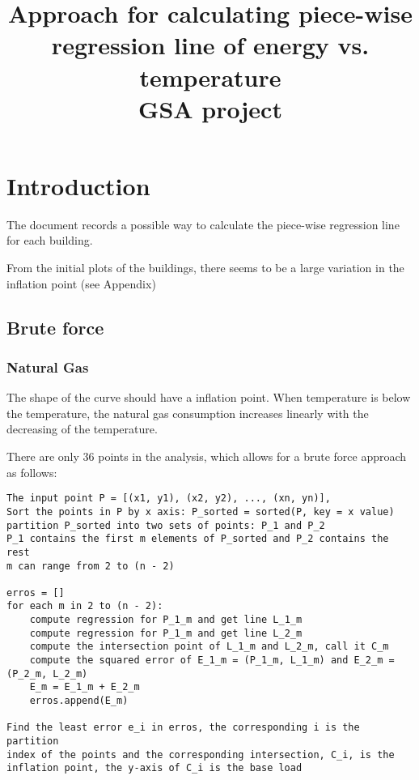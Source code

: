 \documentclass[12pt]{article}
\begin{document}
\title{Approach for calculating piece-wise regression line of energy vs. temperature\\
  \large GSA project}
\maketitle
\tableofcontents
\section{Introduction}
The document records a possible way to calculate the piece-wise
regression line for each building.

From the initial plots of the buildings, there seems to be a large
variation in the inflation point (see Appendix)

\subsection{Brute force}
\subsubsection{Natural Gas}
The shape of the curve should have a inflation point. When temperature
is below the temperature, the natural gas consumption increases
linearly with the decreasing of the temperature.

There are only 36 points in the analysis, which allows for a brute
force approach as follows:

\begin{verbatim}
The input point P = [(x1, y1), (x2, y2), ..., (xn, yn)], 
Sort the points in P by x axis: P_sorted = sorted(P, key = x value)
partition P_sorted into two sets of points: P_1 and P_2
P_1 contains the first m elements of P_sorted and P_2 contains the
rest
m can range from 2 to (n - 2)

erros = []
for each m in 2 to (n - 2):
    compute regression for P_1_m and get line L_1_m
    compute regression for P_1_m and get line L_2_m
    compute the intersection point of L_1_m and L_2_m, call it C_m
    compute the squared error of E_1_m = (P_1_m, L_1_m) and E_2_m = (P_2_m, L_2_m)
    E_m = E_1_m + E_2_m
    erros.append(E_m)

Find the least error e_i in erros, the corresponding i is the partition
index of the points and the corresponding intersection, C_i, is the 
inflation point, the y-axis of C_i is the base load
\end{verbatim}
\end{document}
